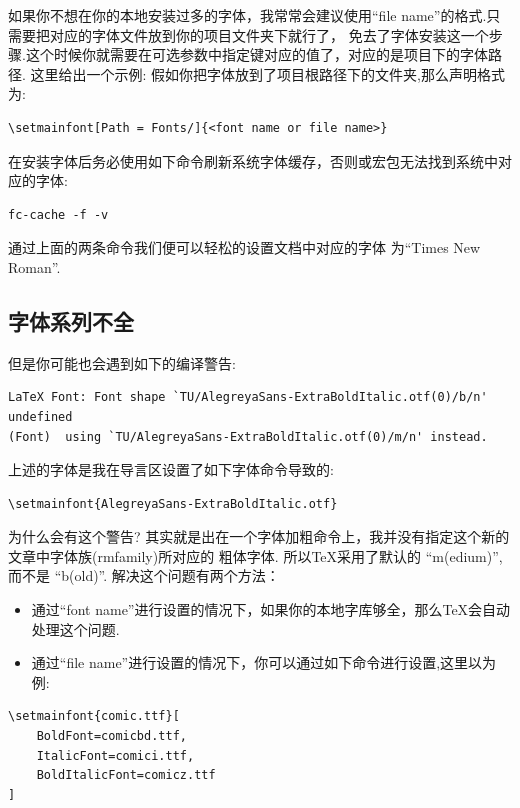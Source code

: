 \begin{leftbar}
如果你不想在你的本地安装过多的字体，我常常会建议使用``file name''的格式.只需要把对应的字体文件放到你的项目文件夹下就行了，
免去了字体安装这一个步骤.这个时候你就需要在可选参数中指定键对应的值了，对应的是项目下的字体路径. 这里给出一个示例:
假如你把字体放到了项目根路径下的文件夹,那么声明格式为:
\end{leftbar}
\begin{verbatim}
\setmainfont[Path = Fonts/]{<font name or file name>}
\end{verbatim}

在安装字体后务必使用如下命令刷新系统字体缓存，否则或宏包无法找到系统中对应的字体:
\begin{verbatim}
fc-cache -f -v
\end{verbatim}

通过上面的两条命令我们便可以轻松的设置文档中对应的字体
为``Times New Roman''.

\subsection{字体系列不全}
但是你可能也会遇到如下的编译警告:
\begin{verbatim}
LaTeX Font: Font shape `TU/AlegreyaSans-ExtraBoldItalic.otf(0)/b/n' undefined
(Font)	using `TU/AlegreyaSans-ExtraBoldItalic.otf(0)/m/n' instead.
\end{verbatim}

上述的字体是我在导言区设置了如下字体命令导致的:
\begin{verbatim}
\setmainfont{AlegreyaSans-ExtraBoldItalic.otf}
\end{verbatim}

为什么会有这个警告? 其实就是出在一个字体加粗命令\cmd{\textbf}上，我并没有指定这个新的文章中字体族(rmfamily)所对应的
粗体字体. 所以\TeX{}采用了默认的 ``m(edium)'', 而不是 ``b(old)''. 解决这个问题有两个方法：
\begin{itemize}
    \item 通过``font name''进行设置的情况下，如果你的本地字库够全，那么\TeX{}会自动处理这个问题.
    \item 通过``file name''进行设置的情况下，你可以通过如下命令进行设置,这里以为例:
\end{itemize}

\begin{verbatim}
\setmainfont{comic.ttf}[
    BoldFont=comicbd.ttf,
    ItalicFont=comici.ttf,
    BoldItalicFont=comicz.ttf
]
\end{verbatim}

